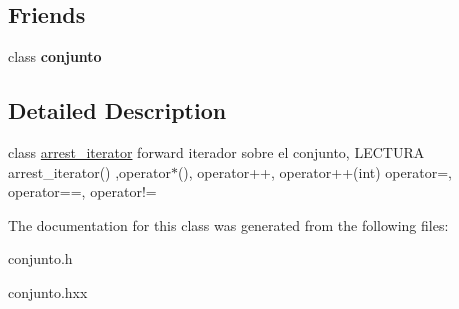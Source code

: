 \subsection*{Friends}
\begin{DoxyCompactItemize}
\item 
\hypertarget{classconjunto_1_1arrest__iterator_a42fdcda39c77eabd7380e29fcdbe5dd2}{}class {\bfseries conjunto}\label{classconjunto_1_1arrest__iterator_a42fdcda39c77eabd7380e29fcdbe5dd2}

\end{DoxyCompactItemize}


\subsection{Detailed Description}
class \hyperlink{classconjunto_1_1arrest__iterator}{arrest\+\_\+iterator} forward iterador sobre el conjunto, L\+E\+C\+T\+U\+R\+A arrest\+\_\+iterator() ,operator$\ast$(), operator++, operator++(int) operator=, operator==, operator!= 

The documentation for this class was generated from the following files\+:\begin{DoxyCompactItemize}
\item 
conjunto.\+h\item 
conjunto.\+hxx\end{DoxyCompactItemize}
